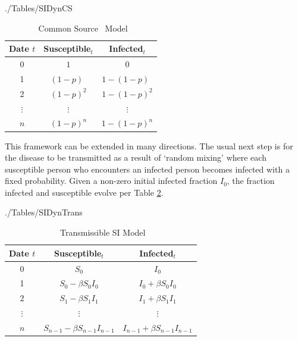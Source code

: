\begin{verbatimwrite}{./Tables/SIDynCS}
  \begin{table}[ht]
    \centering
    \caption{ ~Common Source \Susceptible\Infected~Model}\label{table:SIDyn} \medskip
    \begin{tabular}{ccc}
      \hline
      Date $t$ & Susceptible$_t$ & Infected$_t$ \\
      \hline
      0 & $1$  &  $0$ \\
      \hline
      1 & $(1-p)\phantom{^2}$ & $1-(1-p)\phantom{^2}$ \\
      \hline
      2 & $(1-p)^{2}$ & $1-(1-p)^{2}$ \\
      \hline
      $\vdots$ & $\vdots$ & $\vdots$ \\
      \hline
      $n$ & $(1-p)^{n}$ & $1-(1-p)^{n}$ \\
      \hline
    \end{tabular}
  \end{table}
\end{verbatimwrite}

This framework can be extended in many directions.  The usual next step is for the disease to be transmitted as a result of `random mixing' where each susceptible person who encounters an infected person becomes infected with a fixed probability. Given a non-zero initial infected fraction $I_0$, the fraction  infected and susceptible evolve per Table \ref{table:SIDynTrans}.
\begin{verbatimwrite}{./Tables/SIDynTrans}
  \begin{table}[ht]
    \caption{ ~Transmissible SI Model}\label{table:SIDynTrans}
    \centering\medskip
    \begin{tabular}{ccc}
      \hline
      Date $t$ & Susceptible$_{t}$ & Infected$_{t}$ \\
      \hline
      0 & $S_0$  &  $I_0$ \\
      \hline
      1 & $S_0 - \beta S_0I_0$ & $I_0+\beta S_0I_0$ \\
      \hline
      2 & $S_1-\beta S_1I_1$ & $I_1+\beta S_1I_1$ \\
      \hline
      $\vdots$ & $\vdots$ & $\vdots$ \\
      \hline
      $n$ & $S_{n-1}-\beta S_{n-1}I_{n-1}$ & $I_{n-1}+\beta S_{n-1}I_{n-1}$ \\
      \hline
    \end{tabular}
  \end{table}
\end{verbatimwrite}


